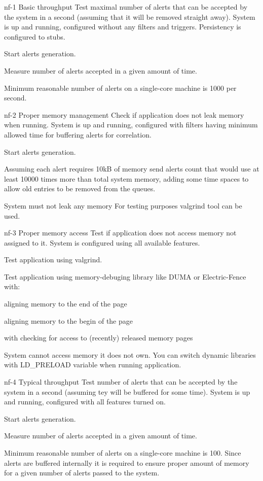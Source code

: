 \testCase
{nf-1}
{Basic throughput}
{Test maximal number of alerts that can be accepted by the system in a second (assuming that it will be removed straight away).}
{System is up and running, configured without any filters and triggers. Persistency is configured to stubs.}
{
\begin{enumerate*}
\item Start alerts generation.
\item Measure number of alerts accepted in a given amount of time.
\end{enumerate*}
}
{Minimum reasonable number of alerts on a single-core machine is 1000 per second.}
{}


\testCase
{nf-2}
{Proper memory management}
{Check if application does not leak memory when running.}
{System is up and running, configured with filters having minimum allowed time for buffering alerts for correlation.}
{
\begin{enumerate*}
\item Start alerts generation.
\item Assuming each alert requires 10kB of memory send alerts count that would use at least 10000 times more than total system memory, adding some time spaces to allow old entries to be removed from the queues.
\end{enumerate*}
}
{System must not leak any memory}
{For testing purposes valgrind tool can be used.}


\testCase
{nf-3}
{Proper memory access}
{Test if application does not access memory not assigned to it.}
{System is configured using all available features.}
{
\begin{enumerate*}
\item Test application using valgrind.
\item Test application using memory-debuging library like DUMA or Electric-Fence with:
  \begin{enumerate*}
  \item aligning memory to the end of the page
  \item aligning memory to the begin of the page
  \item with checking for access to (recently) released memory pages
  \end{enumerate*}
\end{enumerate*}
}
{System cannot access memory it does not own.}
{You can switch dynamic libraries with LD\_PRELOAD variable when running application.}


\testCase
{nf-4}
{Typical throughput}
{Test number of alerts that can be accepted by the system in a second (assuming tey will be buffered for some time).}
{System is up and running, configured with all features turned on.}
{
\begin{enumerate*}
\item Start alerts generation.
\item Measure number of alerts accepted in a given amount of time.
\end{enumerate*}
}
{Minimum reasonable number of alerts on a single-core machine is 100.}
{Since alerts are buffered internally it is required to ensure proper amount of memory for a given number of alerts passed to the system.}


